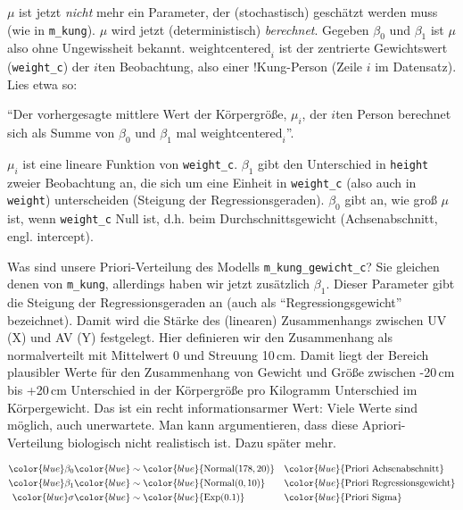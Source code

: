 \documentclass[
  ngerman,
  letterpaper,
  twoside,
  open=any]{scrbook}
\theoremstyle{definition}
\theoremstyle{plain}
\theoremstyle{definition}
\theoremstyle{definition}
\theoremstyle{definition}
\theoremstyle{definition}
\theoremstyle{remark}
\begin{document}
\(\mu\) ist jetzt \emph{nicht} mehr ein Parameter, der (stochastisch)
geschätzt werden muss (wie in \texttt{m\_kung}). \(\mu\) wird jetzt
(deterministisch) \emph{berechnet}. Gegeben \(\beta_0\) und \(\beta_1\)
ist \(\mu\) also ohne Ungewissheit bekannt. \(\text{weightcentered}_i\)
ist der zentrierte Gewichtswert (\texttt{weight\_c}) der \(i\)ten
Beobachtung, also einer !Kung-Person (Zeile \(i\) im Datensatz). Lies
etwa so:

\begin{displayquote}
\enquote{Der vorhergesagte mittlere Wert der Körpergröße, \(\mu_i\), der
\(i\)ten Person berechnet sich als Summe von \(\beta_0\) und \(\beta_1\)
mal \(\text{weightcentered}_i\)}.
\end{displayquote}

\(\mu_i\) ist eine lineare Funktion von \texttt{weight\_c}. \(\beta_1\)
gibt den Unterschied in \texttt{height} zweier Beobachtung an, die sich
um eine Einheit in \texttt{weight\_c} (also auch in \texttt{weight})
unterscheiden (Steigung der Regressionsgeraden). \(\beta_0\) gibt an,
wie groß \(\mu\) ist, wenn \texttt{weight\_c} Null ist, d.h. beim
Durchschnittsgewicht (Achsenabschnitt, engl. intercept).

Was sind unsere Priori-Verteilung des Modells
\texttt{m\_kung\_gewicht\_c}? Sie gleichen denen von \texttt{m\_kung},
allerdings haben wir jetzt zusätzlich \(\beta_1\). Dieser Parameter gibt
die Steigung der Regressionsgeraden an (auch als
\enquote{Regressiongsgewicht} bezeichnet). Damit wird die Stärke des
(linearen) Zusammenhangs zwischen UV (X) und AV (Y) festgelegt. Hier
definieren wir den Zusammenhang als normalverteilt mit Mittelwert 0 und
Streuung 10\,cm. Damit liegt der Bereich plausibler Werte für den
Zusammenhang von Gewicht und Größe zwischen -20\,cm bis +20\,cm
Unterschied in der Körpergröße pro Kilogramm Unterschied im
Körpergewicht. Das ist ein recht informationsarmer Wert: Viele Werte
sind möglich, auch unerwartete. Man kann argumentieren, dass diese
Apriori-Verteilung biologisch nicht realistisch ist. Dazu später mehr.

\begin{align*}
\color{blue}\beta_0 & \color{blue}\sim \color{blue}{\operatorname{Normal}(178, 20)} && \color{blue}{\text{Priori Achsenabschnitt}} \\
\color{blue}\beta_1  & \color{blue}\sim \color{blue}{\operatorname{Normal}(0, 10)}  && \color{blue}{\text{Priori Regressionsgewicht}}\\
\color{blue}\sigma & \color{blue}\sim \color{blue}{\operatorname{Exp}(0.1)}  && \color{blue}{\text{Priori Sigma}}
\end{align*}
\end{document}
